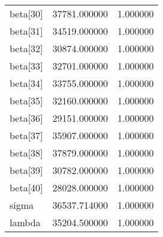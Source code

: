 \begin{tabular}{lrr}
beta[30] & 37781.000000 & 1.000000 \\
beta[31] & 34519.000000 & 1.000000 \\
beta[32] & 30874.000000 & 1.000000 \\
beta[33] & 32701.000000 & 1.000000 \\
beta[34] & 33755.000000 & 1.000000 \\
beta[35] & 32160.000000 & 1.000000 \\
beta[36] & 29151.000000 & 1.000000 \\
beta[37] & 35907.000000 & 1.000000 \\
beta[38] & 37879.000000 & 1.000000 \\
beta[39] & 30782.000000 & 1.000000 \\
beta[40] & 28028.000000 & 1.000000 \\
sigma & 36537.714000 & 1.000000 \\
lambda & 35204.500000 & 1.000000 \\
\bottomrule
\end{tabular}
